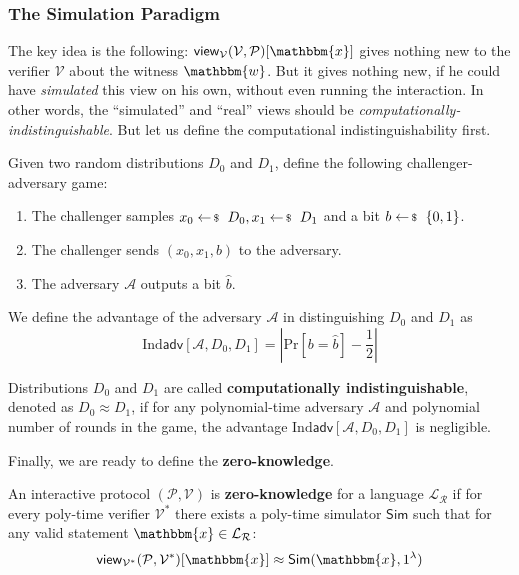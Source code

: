 \documentclass[../lecture-notes-148x210.tex]{subfiles}
\begin{document}
\subsubsection{The Simulation Paradigm}

The key idea is the following: $\mathsf{view}_{\mathcal{V}}(\mathcal{V},
\mathcal{P})[\mathbbm{x}]$ gives nothing new to the verifier $\mathcal{V}$ about
the witness $\mathbbm{w}$. But it gives nothing new, if he could have
\textit{simulated} this view on his own, without even running the interaction.
In other words, the ``simulated'' and ``real'' views should be
\textit{computationally-indistinguishable}. But let us define the computational
indistinguishability first.

\begin{definition}
    Given two random distributions $D_0$ and $D_1$, define the following
    challenger-adversary game:
    \begin{enumerate}
        \item The challenger samples $x_0 \leftarrowS D_0, x_1 \leftarrowS D_1$
        and a bit $b \leftarrowS \{0,1\}$.
        \item The challenger sends $(x_0, x_1, b)$ to the adversary.
        \item The adversary $\mathcal{A}$ outputs a bit $\hat{b}$.
    \end{enumerate}

    We define the advantage of the adversary $\mathcal{A}$ in distinguishing $D_0$ and $D_1$ as 
    \begin{equation*}
        \text{Ind}\textsf{adv}[\mathcal{A}, D_0, D_1] = \left|\text{Pr}[b = \hat{b}] - \frac{1}{2}\right|
    \end{equation*}

    Distributions $D_0$ and $D_1$ are called \textbf{computationally
    indistinguishable}, denoted as $D_0 \approx D_1$, if for any polynomial-time
    adversary $\mathcal{A}$ and polynomial number of rounds in the game, the
    advantage $\text{Ind}\textsf{adv}[\mathcal{A}, D_0, D_1]$ is negligible.
\end{definition}

Finally, we are ready to define the \textbf{zero-knowledge}.

\begin{definition}
    An interactive protocol $(\mathcal{P}, \mathcal{V})$ is
    \textbf{zero-knowledge} for a language $\mathcal{L}_{\mathcal{R}}$ if for
    every poly-time verifier $\mathcal{V}^*$ there exists a poly-time simulator
    $\mathsf{Sim}$ such that for any valid statement $\mathbbm{x} \in
    \mathcal{L}_{\mathcal{R}}$:
    \begin{equation*}
        \mathsf{view}_{\mathcal{V}^*}(\mathcal{P}, \mathcal{V}^*)[\mathbbm{x}] \approx \mathsf{Sim}(\mathbbm{x}, 1^{\lambda})
    \end{equation*}
\end{definition}
\end{document}
